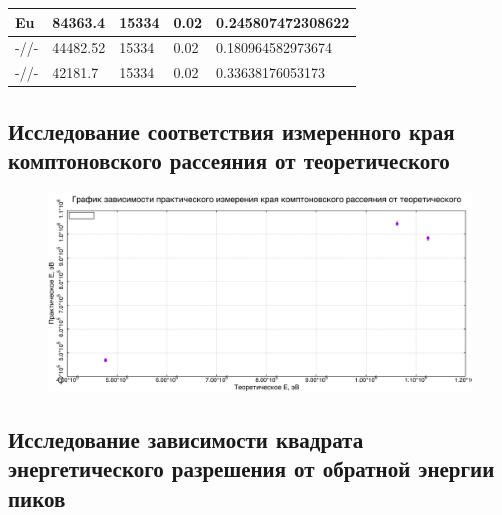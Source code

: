 \begin{table}[h]
\begin{tabular}{|l|l|l|l|l|}
		Eu      & 84363.4                                                        & 15334                                                                                & 0.02                                                                                & 0.245807472308622                                              \\ \hline
		-//-    & 44482.52                                                       & 15334                                                                                & 0.02                                                                                & 0.180964582973674                                              \\ \hline
		-//-    & 42181.7                                                        & 15334                                                                                & 0.02                                                                                & 0.33638176053173                                               \\ \hline
	\end{tabular}
\end{table}

	\newpage

	\subsection{Исследование соответствия измеренного края комптоновского рассеяния от теоретического}
	
	
	\begin{figure}[h]
	\includegraphics[width=\linewidth]{../data/compton.pdf}
	\end{figure}	


	\newpage


	\subsection{Исследование зависимости квадрата энергетического разрешения от обратной энергии пиков}
	

